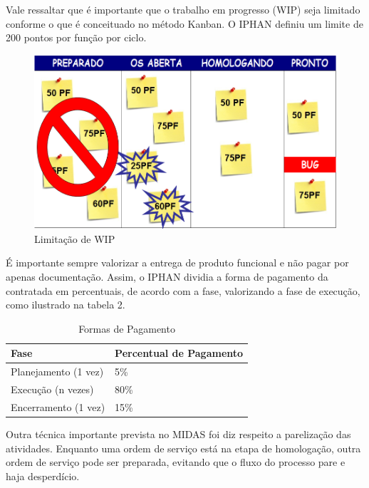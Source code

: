 Vale ressaltar que é importante que o trabalho em progresso (WIP) seja limitado conforme o que é conceituado no método Kanban. O IPHAN definiu um limite de 200 pontos por função por ciclo. 

\begin{figure}[h]
		\centering
		\label{fig08}
			\includegraphics[scale=0.5]{figuras/kanbanIPHAN4.png}
		\caption{Limitação de WIP \cite{parente}}
\end{figure}

É importante sempre valorizar a entrega de produto funcional e não pagar por apenas documentação. Assim, o IPHAN dividia a forma de pagamento da contratada em percentuais, de acordo com a fase, valorizando a fase de execução, como ilustrado na tabela 2.


\begin{table}[H]
\center
\footnotesize
\begin{tabular}{|p{6cm}|p{6cm}|}
  \hline
   \textbf{Fase} & \textbf{Percentual de Pagamento}\\
    \hline
   Planejamento (1 vez) & 5\%\\
   \hline    
   Execução (n vezes) & 80\%\\
    \hline
   Encerramento (1 vez) & 15\%\\
   \hline
\end{tabular}
\caption{Formas de Pagamento}
\end{table}


Outra técnica importante prevista no MIDAS foi diz respeito a parelização das atividades. Enquanto uma ordem de serviço está na etapa de homologação, outra ordem de serviço pode ser preparada, evitando que o fluxo do processo pare e haja desperdício. 

